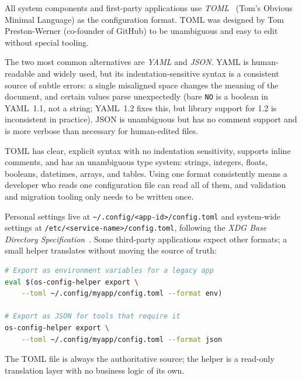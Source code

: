 All system components and first-party applications use
\emph{TOML}~\cite{toml} (Tom's Obvious Minimal Language) as
the configuration format. TOML was designed by Tom Preston-Werner (co-founder of
GitHub) to be unambiguous and easy to edit without special tooling.

The two most common alternatives are \emph{YAML} and \emph{JSON}. YAML is
human-readable and widely used, but its indentation-sensitive syntax is a
consistent source of subtle errors: a single misaligned space changes the meaning
of the document, and certain values parse unexpectedly (bare \texttt{NO} is a boolean in YAML~1.1, not a string; YAML~1.2 fixes this, but library support for 1.2 is inconsistent in practice). JSON is unambiguous but has no comment
support and is more verbose than necessary for human-edited files.

TOML has clear, explicit syntax with no indentation sensitivity, supports inline
comments, and has an unambiguous type system: strings, integers, floats,
booleans, datetimes, arrays, and tables. Using one format consistently means a
developer who reads one configuration file can read all of them, and validation
and migration tooling only needs to be written once.

Personal settings live at
\texttt{\textasciitilde/.config/<app-id>/config.toml} and system-wide settings
at \texttt{/etc/<service-name>/config.toml}, following the
\emph{XDG Base Directory Specification}~\cite{xdg:basedir}. Some third-party applications expect other formats; a
small helper translates without moving the source of truth:

\begin{lstlisting}[language=bash]
# Export as environment variables for a legacy app
eval $(os-config-helper export \
    --toml ~/.config/myapp/config.toml --format env)

# Export as JSON for tools that require it
os-config-helper export \
    --toml ~/.config/myapp/config.toml --format json
\end{lstlisting}

The TOML file is always the authoritative source; the helper is a read-only
translation layer with no business logic of its own.
